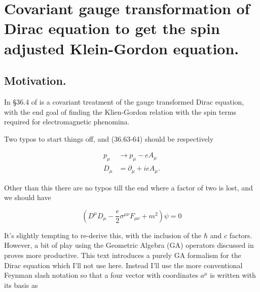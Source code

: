 
%

\chapter{Covariant gauge transformation of Dirac equation to get the spin adjusted Klein-Gordon equation.}
\label{chap:diracCovariant}
{}
\date{Sept 1, 2011}

\newcommand{\pslash}[0]{\cancel{p}}
\newcommand{\aslash}[0]{\cancel{a}}
\newcommand{\bslash}[0]{\cancel{b}}
\newcommand{\Dslash}[0]{\cancel{D}}
\newcommand{\Aslash}[0]{\cancel{A}}
\newcommand{\partialslash}[0]{\cancel{\partial}}

\beginArtWithToc

\section{Motivation.}

In \S 36.4 of \cite{desai2009quantum} is a covariant treatment of the gauge transformed Dirac equation, with the end goal of finding the Klien-Gordon relation with the spin terms required for electromagnetic phenomina.

Two typos to start things off, and (36.63-64) should be respectively

\begin{align}\label{eqn:diracCovariant:10}
p_\mu &\rightarrow p_\mu - e A_\mu \\
D_\mu &= \partial_\mu + i e A_\mu.
\end{align}

Other than this there are no typos till the end where a factor of two is lost, and we should have

\begin{equation}\label{eqn:diracCovariant:30}
\left( D^\mu D_\mu - \frac{e}{2} \sigma^{\mu \nu} F_{\mu \nu} + m^2 \right) \psi = 0
\end{equation}

It's slightly tempting to re-derive this, with the inclusion of the $\hbar$ and $c$ factors.  However, a bit of play using the Geometric Algebra (GA) operators discussed in \cite{doran2003gap} proves more productive.  This text introduces a purely GA formalism for the Dirac equation which I'll not use here.  Instead I'll use the more conventional Feynman slash notation so that a four vector with coordinates $a^\mu$ is written with its basis as


